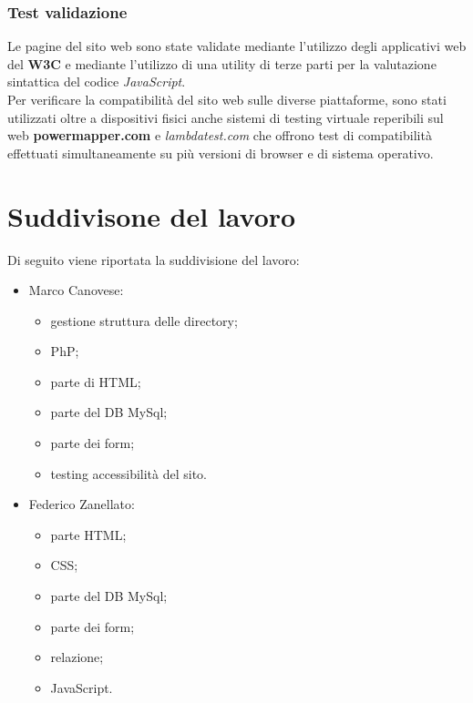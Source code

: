 \subsubsection{Test  validazione}

Le pagine del sito web sono state validate mediante l’utilizzo degli applicativi web del \textbf{W3C} e mediante l’utilizzo di una utility di terze parti per la valutazione sintattica del codice \textit{JavaScript}.\\
Per verificare la compatibilità del sito web sulle diverse piattaforme, sono stati utilizzati oltre a dispositivi fisici anche sistemi di testing virtuale reperibili sul web \textbf{powermapper.com} e \textit{lambdatest.com} che offrono test di compatibilità effettuati simultaneamente su più versioni di browser e di sistema operativo.



\section{Suddivisone del lavoro}
Di seguito viene riportata la suddivisione del lavoro:
\begin{itemize}
	\item Marco Canovese:
	\begin{itemize}
		\item gestione struttura delle directory;
		\item PhP;
		\item parte di HTML;
		\item parte del DB MySql;
		\item parte dei form;
		\item testing accessibilità del sito.
	\end{itemize}
\end{itemize}

\begin{itemize}
	\item Federico Zanellato:
	\begin{itemize}
		\item parte HTML;
		\item CSS;
		\item parte del DB MySql;
		\item parte dei form;
		\item relazione;
		\item JavaScript.
	\end{itemize}
\end{itemize}

